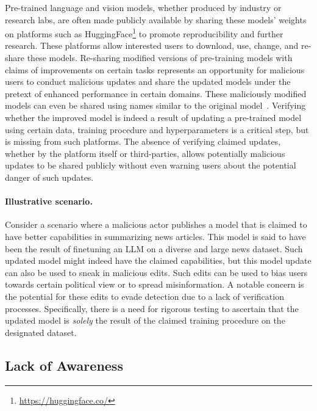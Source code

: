 Pre-trained language and vision models, whether produced by industry or research labs, are often made publicly available by sharing these models' weights on platforms such as HuggingFace\footnote{\url{https://huggingface.co/}} to promote reproducibility and further research. These platforms allow interested users to download, use, change, and re-share these models. Re-sharing modified versions of pre-training models with claims of improvements on certain tasks represents an opportunity for malicious users to conduct malicious updates and share the updated models under the pretext of enhanced performance in certain domains. These maliciously modified models can even be shared using names similar to the original model~\cite{jiang2023empirical}. Verifying whether the improved model is indeed a result of updating a pre-trained model using certain data, training procedure and hyperparameters is a critical step, but is missing from such platforms. 
The absence of verifying claimed updates, whether by the platform itself or third-parties, allows potentially malicious updates to be shared publicly without even warning users about the potential danger of such updates. 


\paragraph{Illustrative scenario.} Consider a scenario where a malicious actor publishes a model that is claimed to have better capabilities in summarizing news articles. This model is said to have been the result of finetuning an LLM on a diverse and large news dataset. Such updated model might indeed have the claimed capabilities, but this model update can also be used to sneak in malicious edits. Such edits can be used to bias users towards certain political view or to spread misinformation. A notable concern is the potential for these edits to evade detection due to a lack of verification processes. Specifically, there is a need for rigorous testing to ascertain that the updated model is \emph{solely} the result of the claimed training procedure on the designated dataset. 







\subsection{Lack of Awareness}
\label{subsec:awareness}

